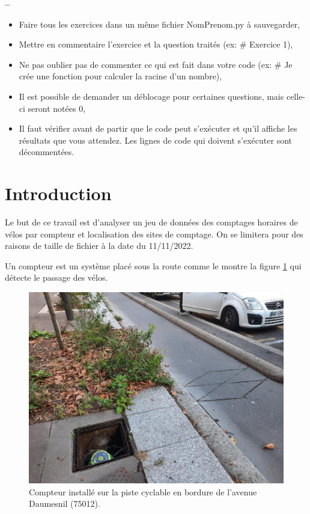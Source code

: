 



\begin{center}
{\Large\bf {\type} \no {\numero} -- \descrip}
\end{center}


\begin{boxedminipage}{.9\textwidth} 
\begin{itemize}
 \item Faire tous les exercices dans un même fichier {NomPrenom.py} à sauvegarder,
 \item Mettre en commentaire l'exercice et la question traités (ex: \# Exercice 1),
 \item Ne pas oublier pas de commenter ce qui est fait dans votre code (ex: \# Je crée une fonction pour calculer la racine d'un nombre),
 \item Il est possible de demander un déblocage pour certaines questions, mais celle-ci seront notées 0,
 \item Il faut vérifier avant de partir que le code peut s'exécuter et qu'il affiche les résultats que vous attendez. Les lignes de code qui doivent s'exécuter sont décommentées.
\end{itemize}
\end{boxedminipage}

\section*{Introduction}

Le but de ce travail est d'analyser un jeu de données des comptages horaires de vélos par compteur et localisation des sites de comptage. On se limitera pour des raisons de taille de fichier à la date du 11/11/2022.

Un compteur est un système placé sous la route comme le montre la figure \ref{img01} qui détecte le passage des vélos.

\begin{figure}[!ht]
\begin{center}
	\includegraphics[width=0.5\linewidth]{img/compteur_daumesnil}
	\caption{Compteur installé sur la piste cyclable en bordure de l'avenue Daumesnil (75012).}
	\label{img01}
\end{center}
\end{figure}

